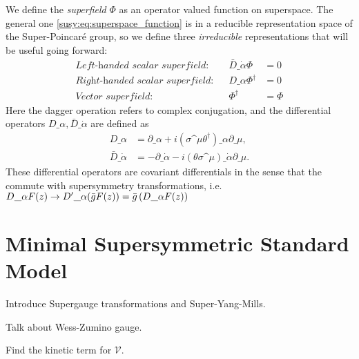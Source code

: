 \documentclass[../main.tex]{subfiles}
\begin{document}
We define the \emph{superfield} \(\Phi\) as an operator valued function on
superspace. The general one \cref{susy:eq:superspace_function} is in a
reducible representation space of the Super-Poincaré group, so we define three
\emph{irreducible} representations that will be useful going forward:
\begin{align}
    \textit{Left-handed scalar superfield:}  &  & \bar{D}\_{\dot\alpha}\Phi & = 0    \\
    \textit{Right-handed scalar superfield:} &  & D\_{\alpha}\Phi^\dagger   & = 0    \\
    \textit{Vector superfield:}              &  & \Phi^\dagger              & = \Phi
\end{align}
Here the dagger operation refers to complex conjugation, and the differential operators \(D\_\alpha, \bar{D}\_{\dot\alpha}\) are defined as
\begin{subequations}
    \begin{align}
        D\_\alpha             & = \partial\_\alpha + i(\sigma\^\mu \theta^\dagger)\_\alpha \partial\_\mu,      \\
        \bar{D}\_{\dot\alpha} & = -\partial\_{\dot\alpha} - i (\theta\sigma\^\mu)\_{\dot\alpha} \partial\_\mu.
    \end{align}
\end{subequations}
These differential operators are covariant differentials in the sense that the commute with supersymmetry transformations, i.e. \(D\_\alpha F(z) \to {D^\prime}\_\alpha (\bar{g} F(z)) = \bar{g} \left(D\_\alpha F(z)\right)\)

\section{Minimal Supersymmetric Standard Model}

\begin{TODO}
    \item [\checked] Introduce Supergauge transformations and Super-Yang-Mills.
    \item Talk about Wess-Zumino gauge.
    \item Find the kinetic term for \(\mathcal{V}\).
\end{TODO}
\end{document}

